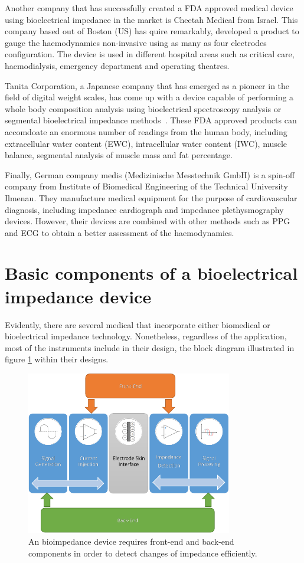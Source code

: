 Another company that has successfully created a FDA approved medical device using bioelectrical impedance in the market is Cheetah Medical \cite{cheetah} from Israel. This company based out of Boston (US) has quire remarkably, developed a product to gauge the haemodynamics non-invasive using as many as four electrodes configuration. The device is used in different hospital areas such as critical care, haemodialysis, emergency department and operating theatres.

Tanita Corporation, a Japanese company that has emerged as a pioneer in the field of digital weight scales, has come up with a device capable of performing a whole body composition analysis using bioelectrical spectroscopy analysis or segmental bioelectrical impedance methods~\cite{tanita}. These FDA approved products can accomdoate an enormous number of readings from the human body, including extracellular water content (EWC), intracellular water content (IWC), muscle balance, segmental analysis of muscle mass and fat percentage.

Finally, German company medis (Medizinische Messtechnik GmbH) \cite{medis} is a spin-off company from Institute of Biomedical Engineering of the Technical University Ilmenau. They manufacture medical equipment for the purpose of cardiovascular diagnosis, including impedance cardiograph and impedance plethysmography devices. However, their devices are combined with other methods such as PPG and ECG to obtain a better assessment of the haemodynamics. 

\section{Basic components of a bioelectrical impedance device}
\label{section impedance basic}
Evidently, there are several medical that incorporate either biomedical or bioelectrical impedance technology. Nonetheless, regardless of the application, most of the instruments include in their design, the block diagram illustrated in figure \ref{fig:block diagram bioimpedance} within their designs. 

\begin{figure}[!htpb]
	\centering
	\includegraphics[width=9cm,keepaspectratio]{figure11}    
	\caption[Block diagram of a common bioimpedance device]{An bioimpedance device requires front-end and back-end components in order to detect changes of impedance efficiently.}
	\label{fig:block diagram bioimpedance}
\end{figure}

